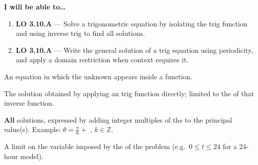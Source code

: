 \documentclass[10pt]{article}
\begin{document}
\namedateperiod

\vspace{0.08in}

\begin{objectivebox}
\textbf{I will be able to\ldots}
\begin{enumerate}[leftmargin=1.5em, itemsep=4pt]
  \item \textbf{LO 3.10.A} --- Solve a trigonometric equation by isolating
    the trig function and using inverse trig to find all solutions.
    \writeline
  \item \textbf{LO 3.10.A} --- Write the general solution of a trig equation
    using periodicity, and apply a domain restriction when context requires it.
    \writeline
\end{enumerate}
\end{objectivebox}

\vspace{0.06in}

\begin{vocabbox}
\begin{description}[leftmargin=0pt, itemsep=5pt]
  \item[\termblanklong{trigonometric equation}]
    An equation in which the unknown appears inside a
    \underline{\hspace{4cm}} function.

  \item[\termblanklong{principal solution}]
    The solution obtained by applying an \underline{\hspace{3.5cm}} trig function
    directly; limited to the \underline{\hspace{3cm}} of that inverse function.

  \item[\termblanklong{general solution}]
    \textbf{All} solutions, expressed by adding integer multiples of the
    \underline{\hspace{3cm}} to the principal value(s).
    Example: $\theta = \tfrac{\pi}{6} + $ \underline{\hspace{1.5cm}},
    $k \in \mathbb{Z}$.

  \item[\termblanklong{domain restriction}]
    A limit on the variable imposed by the \underline{\hspace{4cm}} of the
    problem (e.g.\ $0 \le t \le 24$ for a 24-hour model).
\end{description}
\end{vocabbox}
\end{document}
